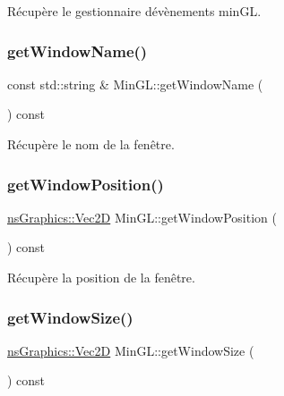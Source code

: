 Récupère le gestionnaire d\textquotesingle{}évènements min\+GL. 

\mbox{\label{class_min_g_l_a46cea08ec9ef4a0678f425000ca77e5b}} 
\subsubsection{\texorpdfstring{get\+Window\+Name()}{getWindowName()}}
{\footnotesize\ttfamily const std\+::string \& Min\+G\+L\+::get\+Window\+Name (\begin{DoxyParamCaption}{ }\end{DoxyParamCaption}) const}



Récupère le nom de la fenêtre. 

\mbox{\label{class_min_g_l_a1ea6ea098988db36f5bf18713f9f3347}} 
\subsubsection{\texorpdfstring{get\+Window\+Position()}{getWindowPosition()}}
{\footnotesize\ttfamily \hyperlink{classns_graphics_1_1_vec2_d}{ns\+Graphics\+::\+Vec2D} Min\+G\+L\+::get\+Window\+Position (\begin{DoxyParamCaption}{ }\end{DoxyParamCaption}) const}



Récupère la position de la fenêtre. 

\mbox{\label{class_min_g_l_a92bacd1567089fb4641ed7b416cfe74d}} 
\subsubsection{\texorpdfstring{get\+Window\+Size()}{getWindowSize()}}
{\footnotesize\ttfamily \hyperlink{classns_graphics_1_1_vec2_d}{ns\+Graphics\+::\+Vec2D} Min\+G\+L\+::get\+Window\+Size (\begin{DoxyParamCaption}{ }\end{DoxyParamCaption}) const}




